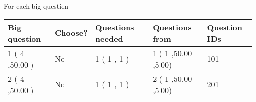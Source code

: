 \documentclass[12pt]{article}
\begin{document}
   
 \newpage
   
{\LARGE{For each big question}}
   
   
\vspace{0.2in}
   
   
\noindent\hspace{-0.4in}\begin{tabular}{|l|l|l|l|l|}
\hline
 Big question & Choose? & Questions needed & Questions from & Question IDs \\ 
\hline
 1 ( 4 ,50.00
 ) &  No   & 
 1 ( 1 ,  1 ) &  1 ( 1
,50.00
 ,5.00) &  101  \\
 \hline
 2 ( 4 ,50.00
 ) &  No   & 
 1 ( 1 ,  1 ) &  2 ( 1
,50.00
 ,5.00) &  201  \\
 \hline
 \end{tabular}
 
 
\end{document}
